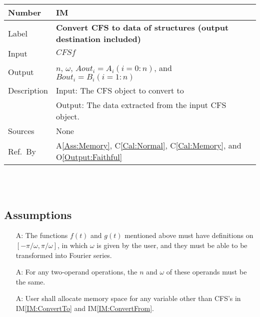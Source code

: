 \documentclass[12pt]{article}
\newcommand{\colAwidth}{0.13\textwidth}
\newcommand{\colBwidth}{0.82\textwidth}
\newcounter{assumpnum} %
\newcommand{\aref}[1]{A\ref{#1}}
\newcommand{\calref}[1]{C\ref{#1}}
\newcommand{\oref}[1]{O\ref{#1}}
\newcounter{instnum} %
\newcommand{\iref}[1]{IM\ref{#1}}
\begin{document}
\noindent
\begin{minipage}{\textwidth}
	\renewcommand*{\arraystretch}{1.5}
	\begin{tabular}{| p{\colAwidth} | p{\colBwidth}|}
		\hline
		\rowcolor[gray]{0.9}
		Number& IM{instnum}\theinstnum \label{IM:ConvertFrom}\\
		\hline
		Label& \bf Convert CFS to data of structures (output destination included) \\
		\hline
		Input& $\mathit{CFSf}$\\
		\hline
		Output& $n$, $\omega$, $\mathit{Aout}_{i}=A_i (i=0:n)$, and $\mathit{Bout}_{i}=B_i (i=1:n)$\\
		Description&Input: The CFS object to convert to\\
		&Output: The data extracted from the input CFS object.\\
		\hline
		Sources&None\\
		\hline
		Ref.\ By &   \aref{Ass:Memory}, \calref{Cal:Normal}, \calref{Cal:Memory}, and \oref{Output:Faithful}
		
		\\
		\hline
	\end{tabular}
\end{minipage}\\
~\newline

\subsection{Assumptions}

\begin{itemize}

\item[A\refstepcounter{assumpnum}\theassumpnum \label{Ass:FunctionProperty}:] The functions $f(t)$ and $g(t)$ mentioned above must have definitions on $[-\pi/\omega, \pi/\omega]$, in which $\omega$ is given by the user, and they must be able to be transformed into Fourier series.
\item[A\refstepcounter{assumpnum}\theassumpnum \label{Ass:CFSPropertyMatch}:] For any two-operand operations, the $n$ and $\omega$ of these operands must be the same. 
\item[A\refstepcounter{assumpnum}\theassumpnum \label{Ass:Memory}:] User shall allocate memory space for any variable other than CFS's in \iref{IM:ConvertTo} and \iref{IM:ConvertFrom}.
\end{itemize}
\end{document}
